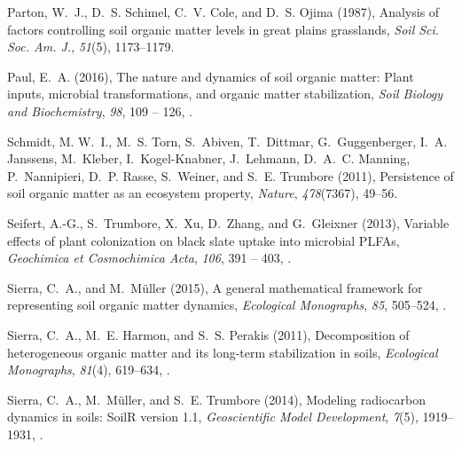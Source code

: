 \documentclass[draft,linenumbers]{agujournal}
\begin{document}
\begin{thebibliography}{41}
Parton, W.~J., D.~S. Schimel, C.~V. Cole, and D.~S. Ojima (1987), Analysis of
  factors controlling soil organic matter levels in great plains grasslands,
  \textit{Soil Sci. Soc. Am. J.}, \textit{51}(5), 1173--1179.

Paul, E.~A. (2016), The nature and dynamics of soil organic matter: Plant
  inputs, microbial transformations, and organic matter stabilization,
  \textit{Soil Biology and Biochemistry}, \textit{98}, 109 -- 126,
  .

Schmidt, M. W.~I., M.~S. Torn, S.~Abiven, T.~Dittmar, G.~Guggenberger, I.~A.
  Janssens, M.~Kleber, I.~Kogel-Knabner, J.~Lehmann, D.~A.~C. Manning,
  P.~Nannipieri, D.~P. Rasse, S.~Weiner, and S.~E. Trumbore (2011), Persistence
  of soil organic matter as an ecosystem property, \textit{Nature},
  \textit{478}(7367), 49--56.

Seifert, A.-G., S.~Trumbore, X.~Xu, D.~Zhang, and G.~Gleixner (2013), Variable
  effects of plant colonization on black slate uptake into microbial {PLFAs},
  \textit{Geochimica et Cosmochimica Acta}, \textit{106}, 391 -- 403,
  .

Sierra, C.~A., and M.~M{\"u}ller (2015), A general mathematical framework for
  representing soil organic matter dynamics, \textit{Ecological Monographs},
  \textit{85}, 505--524, .

Sierra, C.~A., M.~E. Harmon, and S.~S. Perakis (2011), Decomposition of
  heterogeneous organic matter and its long-term stabilization in soils,
  \textit{Ecological Monographs}, \textit{81}(4), 619--634,
  .

Sierra, C.~A., M.~M{\"u}ller, and S.~E. Trumbore (2014), Modeling radiocarbon
  dynamics in soils: {SoilR} version 1.1, \textit{Geoscientific Model
  Development}, \textit{7}(5), 1919--1931, .


\end{thebibliography}
\end{document}
